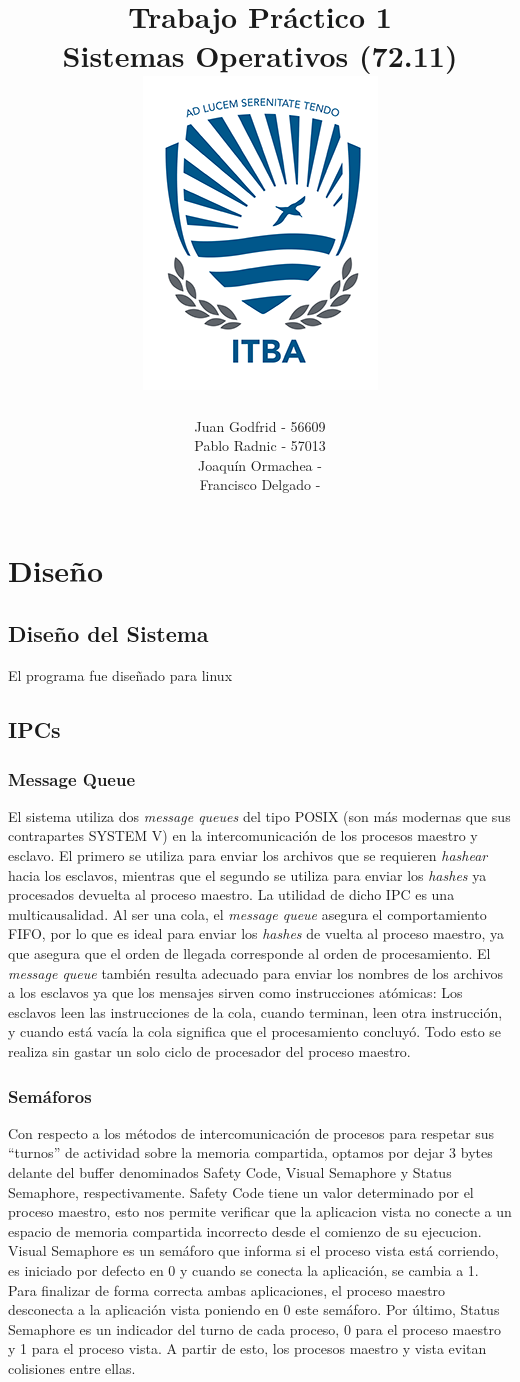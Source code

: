 \documentclass[10pt,a4paper]{report}
\title{
	\bf\color{darkcerulean} Trabajo Práctico 1 \\
	\color{black}Sistemas Operativos (72.11) \\
	\includegraphics{itba-escudo2}
	}
\author{Juan Godfrid - 56609 \\Pablo Radnic - 57013 \\ Joaquín Ormachea - \\Francisco Delgado -}
\begin{document}
\maketitle

\newpage
\tableofcontents
\newpage


\chapter{Diseño}
\section{Diseño del Sistema}
El programa fue diseñado para linux
\section{IPCs}
\subsection{Message Queue}
	El sistema utiliza dos \textit{message queues} del tipo POSIX (son más modernas que sus contrapartes SYSTEM V) en la intercomunicación de los procesos maestro y esclavo. El primero se utiliza para enviar los archivos que se requieren \textit{hashear} hacia los esclavos, mientras que el segundo se utiliza para enviar los \textit{hashes} ya procesados devuelta al proceso maestro. La utilidad de dicho IPC es una multicausalidad. Al ser una cola, el \textit{message queue} asegura el comportamiento FIFO, por lo que es ideal para enviar los \textit{hashes} de vuelta al proceso maestro, ya que asegura que el orden de llegada corresponde al orden de procesamiento. El \textit{message queue} también resulta adecuado para enviar los nombres de los archivos a los esclavos ya que los mensajes sirven como instrucciones atómicas: Los esclavos leen las instrucciones de la cola, cuando terminan, leen otra instrucción, y cuando está vacía la cola significa que el procesamiento concluyó. Todo esto se realiza sin gastar un solo ciclo de procesador del proceso maestro.
\subsection{Semáforos} 
Con respecto a los métodos de intercomunicación de procesos para respetar sus “turnos” de actividad sobre la memoria compartida, optamos por dejar 3 bytes delante del buffer denominados Safety Code, Visual Semaphore y Status Semaphore, respectivamente. 
Safety Code tiene un valor determinado por el proceso maestro, esto nos permite verificar que la aplicacion vista no conecte a un espacio de memoria compartida incorrecto desde el comienzo de su ejecucion. 
Visual Semaphore es un semáforo que informa si el proceso vista está corriendo, es iniciado por defecto en 0 y cuando se conecta la aplicación, se cambia a 1. Para finalizar de forma correcta ambas aplicaciones, el proceso maestro desconecta a la aplicación vista poniendo en 0 este semáforo.
Por último, Status Semaphore es un indicador del turno de cada proceso, 0 para el proceso maestro y 1 para el proceso vista. A partir de esto, los procesos maestro y vista evitan colisiones entre ellas. 
\end{document}
